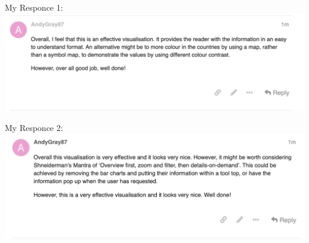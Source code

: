 \begin{flushleft}
	My Responce 1: \\
	\centering	\includegraphics[width=15cm]{Myresponce2}
\end{flushleft}
\begin{flushleft}
	My Responce 2: \\
	\centering	\includegraphics[width=15cm]{Myresponce1}
\end{flushleft}

